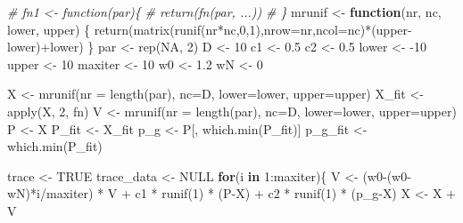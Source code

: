 \documentclass[
  oneside]{book}
\newenvironment{Shaded}{\begin{snugshade}}{\end{snugshade}}
\newcommand{\AttributeTok}[1]{\textcolor[rgb]{0.77,0.63,0.00}{#1}}
\newcommand{\CommentTok}[1]{\textcolor[rgb]{0.56,0.35,0.01}{\textit{#1}}}
\newcommand{\ConstantTok}[1]{\textcolor[rgb]{0.00,0.00,0.00}{#1}}
\newcommand{\ControlFlowTok}[1]{\textcolor[rgb]{0.13,0.29,0.53}{\textbf{#1}}}
\newcommand{\DecValTok}[1]{\textcolor[rgb]{0.00,0.00,0.81}{#1}}
\newcommand{\FloatTok}[1]{\textcolor[rgb]{0.00,0.00,0.81}{#1}}
\newcommand{\FunctionTok}[1]{\textcolor[rgb]{0.00,0.00,0.00}{#1}}
\newcommand{\NormalTok}[1]{#1}
\newcommand{\OtherTok}[1]{\textcolor[rgb]{0.56,0.35,0.01}{#1}}
\newcommand{\SpecialCharTok}[1]{\textcolor[rgb]{0.00,0.00,0.00}{#1}}
\begin{document}
\begin{Shaded}
\begin{Highlighting}[]
\CommentTok{\# fn1 \textless{}{-} function(par)\{}
\CommentTok{\#   return(fn(par, ...))}
\CommentTok{\# \}}
\NormalTok{mrunif }\OtherTok{\textless{}{-}} \ControlFlowTok{function}\NormalTok{(nr, nc, lower, upper) \{}
    \FunctionTok{return}\NormalTok{(}\FunctionTok{matrix}\NormalTok{(}\FunctionTok{runif}\NormalTok{(nr}\SpecialCharTok{*}\NormalTok{nc,}\DecValTok{0}\NormalTok{,}\DecValTok{1}\NormalTok{),}\AttributeTok{nrow=}\NormalTok{nr,}\AttributeTok{ncol=}\NormalTok{nc)}\SpecialCharTok{*}\NormalTok{(upper}\SpecialCharTok{{-}}\NormalTok{lower)}\SpecialCharTok{+}\NormalTok{lower)}
\NormalTok{\}}
\NormalTok{par }\OtherTok{\textless{}{-}} \FunctionTok{rep}\NormalTok{(}\ConstantTok{NA}\NormalTok{, }\DecValTok{2}\NormalTok{)}
\NormalTok{D }\OtherTok{\textless{}{-}} \DecValTok{10}
\NormalTok{c1 }\OtherTok{\textless{}{-}} \FloatTok{0.5}
\NormalTok{c2 }\OtherTok{\textless{}{-}} \FloatTok{0.5}
\NormalTok{lower }\OtherTok{\textless{}{-}} \SpecialCharTok{{-}}\DecValTok{10}
\NormalTok{upper }\OtherTok{\textless{}{-}} \DecValTok{10}
\NormalTok{maxiter }\OtherTok{\textless{}{-}} \DecValTok{10}
\NormalTok{w0 }\OtherTok{\textless{}{-}} \FloatTok{1.2}
\NormalTok{wN }\OtherTok{\textless{}{-}} \DecValTok{0}

\NormalTok{X }\OtherTok{\textless{}{-}} \FunctionTok{mrunif}\NormalTok{(}\AttributeTok{nr =} \FunctionTok{length}\NormalTok{(par), }\AttributeTok{nc=}\NormalTok{D, }\AttributeTok{lower=}\NormalTok{lower, }\AttributeTok{upper=}\NormalTok{upper)}
\NormalTok{X\_fit }\OtherTok{\textless{}{-}} \FunctionTok{apply}\NormalTok{(X, }\DecValTok{2}\NormalTok{, fn)}
\NormalTok{V }\OtherTok{\textless{}{-}} \FunctionTok{mrunif}\NormalTok{(}\AttributeTok{nr =} \FunctionTok{length}\NormalTok{(par), }\AttributeTok{nc=}\NormalTok{D, }\AttributeTok{lower=}\NormalTok{lower, }\AttributeTok{upper=}\NormalTok{upper)}
\NormalTok{P }\OtherTok{\textless{}{-}}\NormalTok{ X}
\NormalTok{P\_fit }\OtherTok{\textless{}{-}}\NormalTok{ X\_fit}
\NormalTok{p\_g }\OtherTok{\textless{}{-}}\NormalTok{ P[, }\FunctionTok{which.min}\NormalTok{(P\_fit)]}
\NormalTok{p\_g\_fit }\OtherTok{\textless{}{-}} \FunctionTok{which.min}\NormalTok{(P\_fit)}

\NormalTok{trace }\OtherTok{\textless{}{-}} \ConstantTok{TRUE}
\NormalTok{trace\_data }\OtherTok{\textless{}{-}} \ConstantTok{NULL}
\ControlFlowTok{for}\NormalTok{(i }\ControlFlowTok{in} \DecValTok{1}\SpecialCharTok{:}\NormalTok{maxiter)\{}
\NormalTok{  V }\OtherTok{\textless{}{-}}\NormalTok{ (w0}\SpecialCharTok{{-}}\NormalTok{(w0}\SpecialCharTok{{-}}\NormalTok{wN)}\SpecialCharTok{*}\NormalTok{i}\SpecialCharTok{/}\NormalTok{maxiter) }\SpecialCharTok{*}\NormalTok{ V }\SpecialCharTok{+}\NormalTok{ c1 }\SpecialCharTok{*} \FunctionTok{runif}\NormalTok{(}\DecValTok{1}\NormalTok{) }\SpecialCharTok{*}\NormalTok{ (P}\SpecialCharTok{{-}}\NormalTok{X) }\SpecialCharTok{+}\NormalTok{ c2 }\SpecialCharTok{*} \FunctionTok{runif}\NormalTok{(}\DecValTok{1}\NormalTok{) }\SpecialCharTok{*}\NormalTok{ (p\_g}\SpecialCharTok{{-}}\NormalTok{X)}
\NormalTok{  X }\OtherTok{\textless{}{-}}\NormalTok{ X }\SpecialCharTok{+}\NormalTok{ V}
  

\end{Highlighting}
\end{Shaded}
\end{document}
